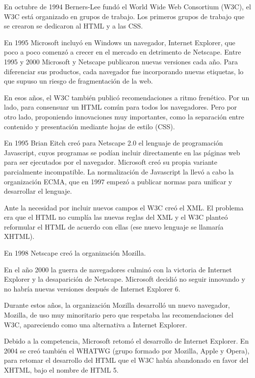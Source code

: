 \documentclass[a4paper, 12pt]{book}
\begin{document}
En octubre de 1994 Berners-Lee fund\'o el World Wide Web Consortium (W3C), el W3C est\'a organizado en grupos de trabajo. Los primeros grupos de trabajo que se crearon se dedicaron al HTML y a las CSS.

En 1995 Microsoft incluy\'o en Windows un navegador, Internet Explorer, que poco a poco comenz\'o a crecer en el mercado en detrimento de Netscape. Entre 1995 y 2000 Microsoft y Netscape publicaron nuevas versiones cada a\~no. Para diferenciar sus productos, cada navegador fue incorporando nuevas etiquetas, lo que supuso un riesgo de fragmentaci\'on de la web.

En esos a\~nos, el W3C tambi\'en public\'o recomendaciones a ritmo fren\'etico. Por un lado, para consensuar un HTML com\'un para todos los navegadores. Pero por otro lado, proponiendo innovaciones muy importantes, como la separaci\'on entre contenido y presentaci\'on mediante hojas de estilo (CSS).

En 1995 Brian Eitch cre\'o para Netscape 2.0 el lenguaje de programaci\'on Javascript, cuyos programas se pod\'ian incluir directamente en las p\'aginas web para ser ejecutados por el navegador. Microsoft cre\'o su propia variante parcialmente incompatible. La normalizaci\'on de Javascript la llev\'o a cabo la organizaci\'on ECMA, que en 1997 empez\'o a publicar normas para unificar y desarrollar el lenguaje.

Ante la necesidad por incluir nuevos campos el W3C cre\'o el XML. El problema era que el HTML no cumpl\'ia las nuevas reglas del XML y el W3C plante\'o reformular el HTML de acuerdo con ellas (ese nuevo lenguaje se llamar\'ia XHTML).

En 1998 Netscape cre\'o la organizaci\'on Mozilla.

En el a\~no 2000 la guerra de navegadores culmin\'o con la victoria de Internet Explorer y la desaparici\'on de Netscape. Microsoft decidi\'o no seguir innovando y no habr\'ia nuevas versiones despu\'es de Internet Explorer 6.

Durante estos a\~nos, la organizaci\'on Mozilla desarroll\'o un nuevo navegador, Mozilla, de uso muy minoritario pero que respetaba las recomendaciones del W3C, apareciendo como una alternativa a Internet Explorer.

Debido a la competencia, Microsoft retom\'o el desarrollo de Internet Explorer. En 2004 se cre\'o tambi\'en el WHATWG (grupo formado por Mozilla, Apple y Opera), para retomar el desarrollo del HTML que el W3C hab\'ia abandonado en favor del XHTML, bajo el nombre de HTML 5.
\end{document}
